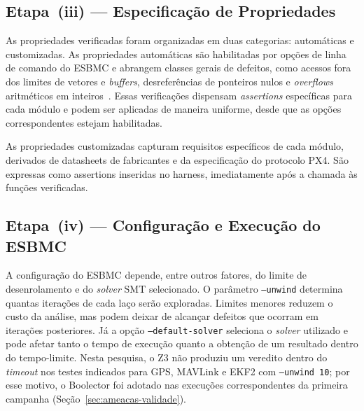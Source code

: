 
\subsection{Etapa~(iii) --- Especificação de Propriedades}

As propriedades verificadas foram organizadas em duas categorias: automáticas e customizadas. As propriedades automáticas são habilitadas por opções de linha de comando do ESBMC e abrangem classes gerais de defeitos, como acessos fora dos limites de vetores e \textit{buffers}, desreferências de ponteiros nulos e \textit{overflows} aritméticos em inteiros~\cite{Cordeiro2012}. Essas verificações dispensam \textit{assertions} específicas para cada módulo e podem ser aplicadas de maneira uniforme, desde que as opções correspondentes estejam habilitadas.

As propriedades customizadas capturam requisitos específicos de cada módulo,
derivados de datasheets de fabricantes e da especificação do protocolo PX4. São
expressas como assertions inseridas no harness, imediatamente após a chamada às
funções verificadas. 

\subsection{Etapa~(iv) --- Configuração e Execução do ESBMC}

A configuração do ESBMC depende, entre outros fatores, do limite de desenrolamento e do \textit{solver} SMT selecionado. O parâmetro \texttt{--unwind} determina quantas iterações de cada laço serão exploradas. Limites menores reduzem o custo da análise, mas podem deixar de alcançar defeitos que ocorram em iterações posteriores. Já a opção \texttt{--default-solver} seleciona o \textit{solver} utilizado e pode afetar tanto o tempo de execução quanto a obtenção de um resultado dentro do tempo-limite. Nesta pesquisa, o Z3 não produziu um veredito dentro do \textit{timeout} nos testes indicados para GPS, MAVLink e EKF2 com \texttt{--unwind 10}; por esse motivo, o Boolector foi adotado nas execuções correspondentes da primeira campanha (Seção~\ref{sec:ameacas-validade}).

